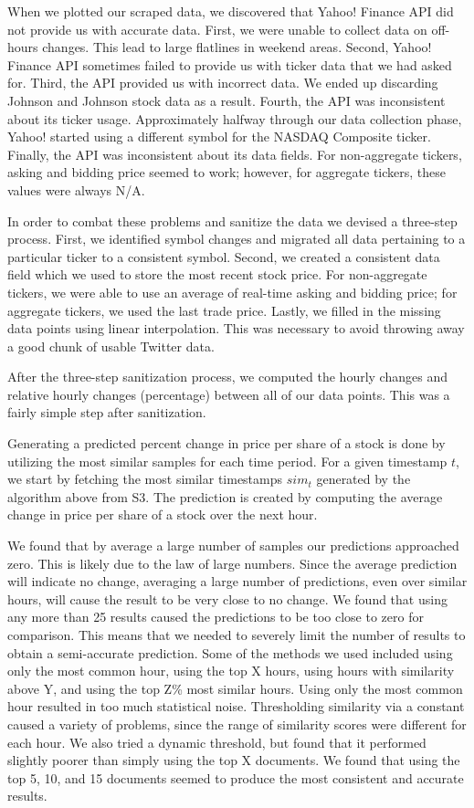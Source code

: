 \documentclass[twocolumn]{article}
\begin{document}
When we plotted our scraped data, we discovered that Yahoo! Finance API did not provide us with accurate data. First, we were unable to collect data on off-hours changes. This lead to large flatlines in weekend areas. Second, Yahoo! Finance API sometimes failed to provide us with ticker data that we had asked for. Third, the API provided us with incorrect data. We ended up discarding Johnson and Johnson stock data as a result. Fourth, the API was inconsistent about its ticker usage. Approximately halfway through our data collection phase, Yahoo! started using a different symbol for the NASDAQ Composite ticker. Finally, the API was inconsistent about its data fields. For non-aggregate tickers, asking and bidding price seemed to work; however, for aggregate tickers, these values were always N/A.

In order to combat these problems and sanitize the data we devised a three-step process. First, we identified symbol changes and migrated all data pertaining to a particular ticker to a consistent symbol. Second, we created a consistent data field which we used to store the most recent stock price. For non-aggregate tickers, we were able to use an average of real-time asking and bidding price; for aggregate tickers, we used the last trade price. Lastly, we filled in the missing data points using linear interpolation. This was necessary to avoid throwing away a good chunk of usable Twitter data.

After the three-step sanitization process, we computed the hourly changes and relative hourly changes (percentage) between all of our data points. This was a fairly simple step after sanitization.

Generating a predicted percent change in price per share of a stock is done by utilizing the most similar samples for each time period. For a given timestamp $t$, we start by fetching the most similar timestamps $sim_t$ generated by the algorithm above from S3. The prediction is created by computing the average change in price per share of a stock over the next hour. 

We found that by average a large number of samples our predictions approached zero. This is likely due to the law of large numbers. Since the average prediction will indicate no change, averaging a large number of predictions, even over similar hours, will cause the result to be very close to no change. We found that using any more than 25 results caused the predictions to be too close to zero for comparison. This means that we needed to severely limit the number of results to obtain a semi-accurate prediction. Some of the methods we used included using only the most common hour, using the top X hours, using hours with similarity above Y, and using the top Z\% most similar hours. Using only the most common hour resulted in too much statistical noise. Thresholding similarity via a constant caused a variety of problems, since the range of similarity scores were different for each hour. We also tried a dynamic threshold, but found that it performed slightly poorer than simply using the top X documents. We found that using the top 5, 10, and 15 documents seemed to produce the most consistent and accurate results.
\end{document}
